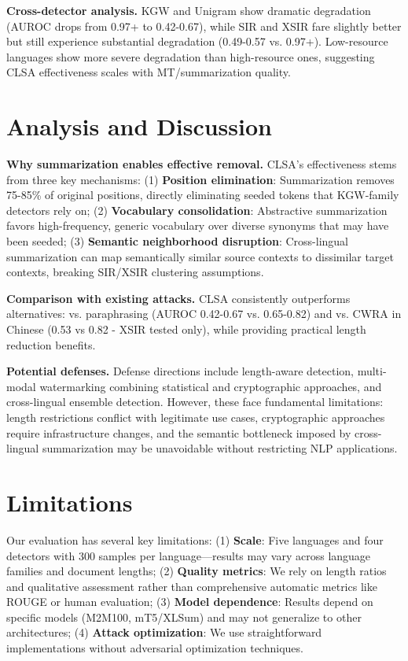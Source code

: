 \documentclass{article}
\begin{document}
\textbf{Cross-detector analysis.}
KGW and Unigram show dramatic degradation (AUROC drops from 0.97+ to 0.42-0.67), while SIR and XSIR fare slightly better but still experience substantial degradation (0.49-0.57 vs. 0.97+). Low-resource languages show more severe degradation than high-resource ones, suggesting CLSA effectiveness scales with MT/summarization quality.

\section{Analysis and Discussion}

\textbf{Why summarization enables effective removal.}
CLSA's effectiveness stems from three key mechanisms: (1) \textbf{Position elimination}: Summarization removes 75-85\% of original positions, directly eliminating seeded tokens that KGW-family detectors rely on; (2) \textbf{Vocabulary consolidation}: Abstractive summarization favors high-frequency, generic vocabulary over diverse synonyms that may have been seeded; (3) \textbf{Semantic neighborhood disruption}: Cross-lingual summarization can map semantically similar source contexts to dissimilar target contexts, breaking SIR/XSIR clustering assumptions.

\textbf{Comparison with existing attacks.}
CLSA consistently outperforms alternatives: vs. paraphrasing (AUROC 0.42-0.67 vs. 0.65-0.82) and vs. CWRA in Chinese (0.53 vs 0.82 - XSIR tested only), while providing practical length reduction benefits.

\textbf{Potential defenses.}
Defense directions include length-aware detection, multi-modal watermarking combining statistical and cryptographic approaches, and cross-lingual ensemble detection. However, these face fundamental limitations: length restrictions conflict with legitimate use cases, cryptographic approaches require infrastructure changes, and the semantic bottleneck imposed by cross-lingual summarization may be unavoidable without restricting NLP applications.

\section{Limitations}

Our evaluation has several key limitations: (1) \textbf{Scale}: Five languages and four detectors with 300 samples per language—results may vary across language families and document lengths; (2) \textbf{Quality metrics}: We rely on length ratios and qualitative assessment rather than comprehensive automatic metrics like ROUGE or human evaluation; (3) \textbf{Model dependence}: Results depend on specific models (M2M100, mT5/XLSum) and may not generalize to other architectures; (4) \textbf{Attack optimization}: We use straightforward implementations without adversarial optimization techniques.
\end{document}
